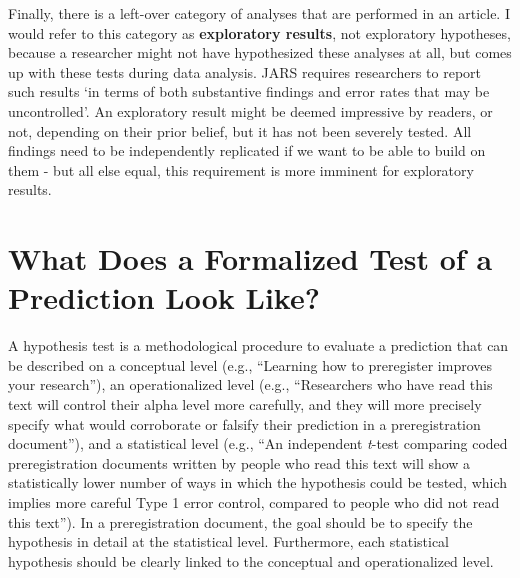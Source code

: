 \documentclass[
  oneside]{krantz}
\begin{document}
Finally, there is a left-over category of analyses that are performed in an article. I would refer to this category as \textbf{exploratory results}, not exploratory hypotheses, because a researcher might not have hypothesized these analyses at all, but comes up with these tests during data analysis. JARS requires researchers to report such results `in terms of both substantive findings and error rates that may be uncontrolled'. An exploratory result might be deemed impressive by readers, or not, depending on their prior belief, but it has not been severely tested. All findings need to be independently replicated if we want to be able to build on them - but all else equal, this requirement is more imminent for exploratory results.

\hypertarget{what-does-a-formalized-test-of-a-prediction-look-like}{%
\section{What Does a Formalized Test of a Prediction Look Like?}\label{what-does-a-formalized-test-of-a-prediction-look-like}}

A hypothesis test is a methodological procedure to evaluate a prediction that can be described on a conceptual level (e.g., ``Learning how to preregister improves your research''), an operationalized level (e.g., ``Researchers who have read this text will control their alpha level more carefully, and they will more precisely specify what would corroborate or falsify their prediction in a preregistration document''), and a statistical level (e.g., ``An independent \emph{t}-test comparing coded preregistration documents written by people who read this text will show a statistically lower number of ways in which the hypothesis could be tested, which implies more careful Type 1 error control, compared to people who did not read this text''). In a preregistration document, the goal should be to specify the hypothesis in detail at the statistical level. Furthermore, each statistical hypothesis should be clearly linked to the conceptual and operationalized level.
\end{document}
